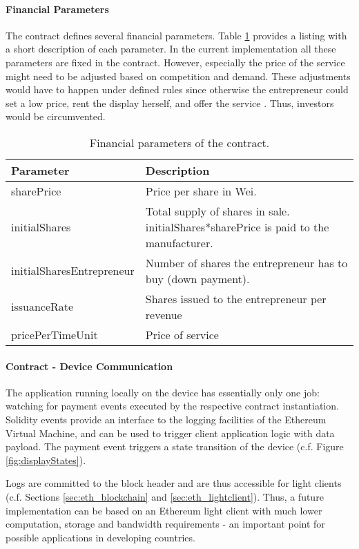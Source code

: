 \paragraph{Financial Parameters}

The contract defines several financial parameters. Table \ref{tbl:parameters} provides a listing with a short description of each parameter. In the current implementation all these parameters are fixed in the contract. However, especially the price of the service might need to be adjusted based on competition and demand. These adjustments would have to happen under defined rules since otherwise the entrepreneur could set a low price, rent the display herself, and offer the service . Thus, investors would be circumvented.

 \begin{table}
  \centering
  \begin{tabularx}{\textwidth}{ l  X  }
    \toprule
    Parameter & Description \\
    \midrule
    sharePrice & Price per share in Wei. \\ 
    initialShares & Total supply of shares in sale. initialShares*sharePrice is paid to the manufacturer.\\
    initialSharesEntrepreneur & Number of shares the entrepreneur has to buy (down payment). \\
    issuanceRate & Shares issued to the entrepreneur per revenue \\  
    pricePerTimeUnit & Price of service \\  
    \bottomrule
  \end{tabularx}
  \caption{Financial parameters of the contract.}
  \label{tbl:parameters}
\end{table}


\paragraph{Contract - Device Communication}

The application running locally on the device has essentially only one job: watching for payment events executed by the respective contract instantiation. Solidity events provide an interface to the logging facilities of the Ethereum Virtual Machine, and can be used to trigger client application logic with data payload. The payment event triggers a state transition of the device (c.f. Figure \ref{fig:displayStates}).

Logs are committed to the block header and are thus accessible for light clients (c.f. Sections \ref{sec:eth_blockchain} and \ref{sec:eth_lightclient}). Thus, a future implementation can be based on an Ethereum light client with much lower computation, storage and bandwidth requirements - an important point for possible applications in developing countries.

